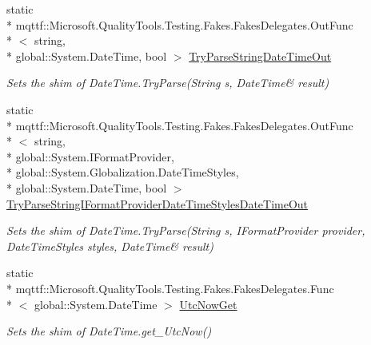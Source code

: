 \begin{DoxyCompactItemize}
static \\*
mqttf\-::\-Microsoft.\-Quality\-Tools.\-Testing.\-Fakes.\-Fakes\-Delegates.\-Out\-Func\\*
$<$ string, \\*
global\-::\-System.\-Date\-Time, bool $>$ \hyperlink{class_system_1_1_fakes_1_1_shim_date_time_a9203cb2a571663e378753ccbc41c846e}{Try\-Parse\-String\-Date\-Time\-Out}
\begin{DoxyCompactList}\small\item\em Sets the shim of Date\-Time.\-Try\-Parse(String s, Date\-Time\& result)\end{DoxyCompactList}\item 
static \\*
mqttf\-::\-Microsoft.\-Quality\-Tools.\-Testing.\-Fakes.\-Fakes\-Delegates.\-Out\-Func\\*
$<$ string, \\*
global\-::\-System.\-I\-Format\-Provider, \\*
global\-::\-System.\-Globalization.\-Date\-Time\-Styles, \\*
global\-::\-System.\-Date\-Time, bool $>$ \hyperlink{class_system_1_1_fakes_1_1_shim_date_time_aa3a1f9b515db5f5c2990c5dc278a9858}{Try\-Parse\-String\-I\-Format\-Provider\-Date\-Time\-Styles\-Date\-Time\-Out}
\begin{DoxyCompactList}\small\item\em Sets the shim of Date\-Time.\-Try\-Parse(String s, I\-Format\-Provider provider, Date\-Time\-Styles styles, Date\-Time\& result)\end{DoxyCompactList}\item 
static \\*
mqttf\-::\-Microsoft.\-Quality\-Tools.\-Testing.\-Fakes.\-Fakes\-Delegates.\-Func\\*
$<$ global\-::\-System.\-Date\-Time $>$ \hyperlink{class_system_1_1_fakes_1_1_shim_date_time_ae70a386e8539caf306651c98c16e5107}{Utc\-Now\-Get}
\begin{DoxyCompactList}\small\item\em Sets the shim of Date\-Time.\-get\-\_\-\-Utc\-Now()\end{DoxyCompactList}\end{DoxyCompactItemize}


